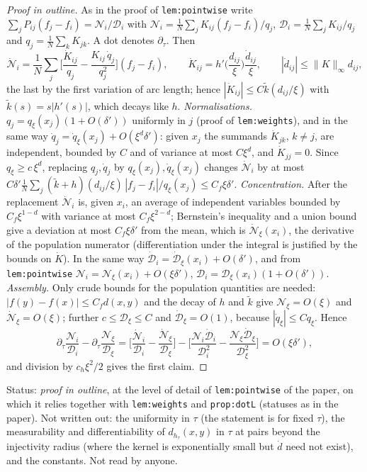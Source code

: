 \documentclass[a4paper,11pt]{article}
\theoremstyle{definition}
\theoremstyle{remark}
\newcommand{\status}[1]{\par\noindent\textsf{\small Status: #1}\par}
\begin{document}
\begin{proof}[Proof in outline]
As in the proof of \texttt{lem:pointwise} write $\sum_jP_{ij}(f_j-f_i)=\mathcal N_i/\mathcal D_i$ with $\mathcal N_i=\frac1N\sum_jK_{ij}(f_j-f_i)/q_j$, $\mathcal D_i=\frac1N\sum_jK_{ij}/q_j$ and $q_j=\frac1N\sum_kK_{jk}$. A dot denotes $\partial_\tau$. Then
\[
\dot{\mathcal N}_i=\frac1N\sum_j\Big[\frac{\dot K_{ij}}{q_j}-\frac{K_{ij}\,\dot q_j}{q_j^2}\Big](f_j-f_i),\qquad
\dot K_{ij}=h'\!\Big(\frac{d_{ij}}\xi\Big)\frac{\dot d_{ij}}\xi,\qquad|\dot d_{ij}|\le\|K\|_\infty d_{ij},
\]
the last by the first variation of arc length; hence $|\dot K_{ij}|\le C\tilde k(d_{ij}/\xi)$ with $\tilde k(s)=s|h'(s)|$, which decays like $h$. \emph{Normalisations.} $q_j=q_\xi(x_j)(1+O(\delta'))$ uniformly in $j$ (proof of \texttt{lem:weights}), and in the same way $\dot q_j=\dot q_\xi(x_j)+O(\xi^d\delta')$: given $x_j$ the summands $\dot K_{jk}$, $k\ne j$, are independent, bounded by $C$ and of variance at most $C\xi^d$, and $\dot K_{jj}=0$. Since $q_\xi\ge c\,\xi^d$, replacing $q_j,\dot q_j$ by $q_\xi(x_j),\dot q_\xi(x_j)$ changes $\dot{\mathcal N}_i$ by at most $C\delta'\frac1N\sum_j(\tilde k+h)(d_{ij}/\xi)\,|f_j-f_i|/q_\xi(x_j)\le C_f\xi\delta'$. \emph{Concentration.} After the replacement $\dot{\mathcal N}_i$ is, given $x_i$, an average of independent variables bounded by $C_f\xi^{1-d}$ with variance at most $C_f\xi^{2-d}$; Bernstein's inequality and a union bound give a deviation at most $C_f\xi\delta'$ from the mean, which is $\dot{\mathcal N}_\xi(x_i)$, the derivative of the population numerator (differentiation under the integral is justified by the bounds on $\dot K$). In the same way $\dot{\mathcal D}_i=\dot{\mathcal D}_\xi(x_i)+O(\delta')$, and from \texttt{lem:pointwise} $\mathcal N_i=\mathcal N_\xi(x_i)+O(\xi\delta')$, $\mathcal D_i=\mathcal D_\xi(x_i)(1+O(\delta'))$. \emph{Assembly.} Only crude bounds for the population quantities are needed: $|f(y)-f(x)|\le C_fd(x,y)$ and the decay of $h$ and $\tilde k$ give $\mathcal N_\xi=O(\xi)$ and $\dot{\mathcal N}_\xi=O(\xi)$; further $c\le\mathcal D_\xi\le C$ and $\dot{\mathcal D}_\xi=O(1)$, because $|\dot q_\xi|\le Cq_\xi$. Hence
\[
\partial_\tau\frac{\mathcal N_i}{\mathcal D_i}-\partial_\tau\frac{\mathcal N_\xi}{\mathcal D_\xi}
=\Big[\frac{\dot{\mathcal N}_i}{\mathcal D_i}-\frac{\dot{\mathcal N}_\xi}{\mathcal D_\xi}\Big]-\Big[\frac{\mathcal N_i\dot{\mathcal D}_i}{\mathcal D_i^2}-\frac{\mathcal N_\xi\dot{\mathcal D}_\xi}{\mathcal D_\xi^2}\Big]=O(\xi\delta'),
\]
and division by $c_h\xi^2/2$ gives the first claim.
\end{proof}
\status{\emph{proof in outline}, at the level of detail of \texttt{lem:pointwise} of the paper, on which it relies together with \texttt{lem:weights} and \texttt{prop:dotL} (statuses as in the paper). Not written out: the uniformity in $\tau$ (the statement is for fixed $\tau$), the measurability and differentiability of $d_{h_\tau}(x,y)$ in $\tau$ at pairs beyond the injectivity radius (where the kernel is exponentially small but $\dot d$ need not exist), and the constants. Not read by anyone.}
\end{document}
